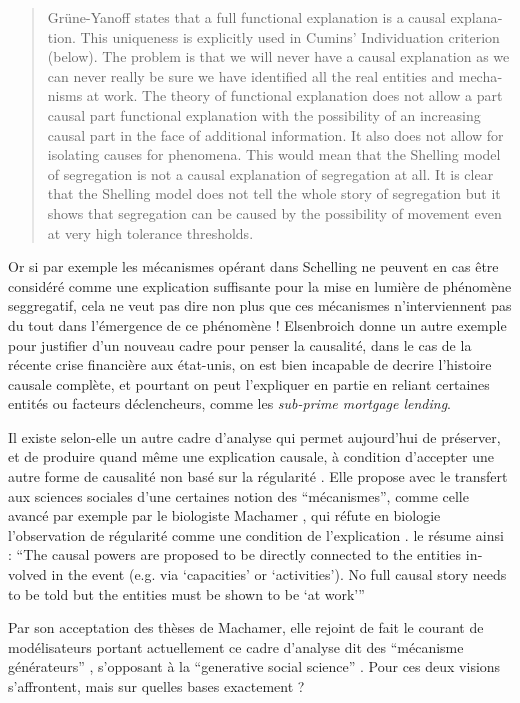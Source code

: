 \foreignblockquote{english}[\cite{Elsenbroich2012}]{Grüne-Yanoff states that a full functional explanation is a causal explanation. This uniqueness is explicitly used in Cumins' Individuation criterion (below). The problem is that we will never have a causal explanation as we can never really be sure we have identified all the real entities and mechanisms at work. The theory of functional explanation does not allow a part causal part functional explanation with the possibility of an increasing causal part in the face of additional information. It also does not allow for isolating causes for phenomena. This would mean that the Shelling model of segregation is not a causal explanation of segregation at all. It is clear that the Shelling model does not tell the whole story of segregation but it shows that segregation can be caused by the possibility of movement even at very high tolerance thresholds.}

Or si par exemple les mécanismes opérant dans Schelling ne peuvent en cas être considéré comme une explication suffisante pour la mise en lumière de phénomène seggregatif, cela ne veut pas dire non plus que ces mécanismes n'interviennent pas du tout dans l'émergence de ce phénomène ! Elsenbroich donne un autre exemple pour justifier d'un nouveau cadre pour penser la causalité, dans le cas de la récente crise financière aux état-unis, on est bien incapable de decrire l'histoire causale complète, et pourtant on peut l'expliquer en partie en reliant certaines entités ou facteurs déclencheurs, comme les \textit{sub-prime mortgage lending}.

Il existe selon-elle un autre cadre d'analyse qui permet aujourd'hui de préserver, et de produire quand même une explication causale, à condition d'accepter une autre forme de causalité non basé sur la régularité . Elle propose avec \textcite{Hedstrom2010} le transfert aux sciences sociales d'une certaines notion des \enquote{mécanismes}, comme celle avancé par exemple par le biologiste Machamer \textcite{Machamer2000}, qui réfute en biologie l'observation de régularité comme une condition de l'explication . \textcite{Elsenbroich2012} le résume ainsi : \foreignquote{english}{The causal powers are proposed to be directly connected to the entities involved in the event (e.g. via \enquote{capacities} or \enquote{activities}). No full causal story needs to be told but the entities must be shown to be \enquote{at work}} 

Par son acceptation des thèses de Machamer, elle rejoint de fait le courant de modélisateurs portant actuellement ce cadre d'analyse dit des \enquote{mécanisme générateurs} \autocites{Hedstrom2010, Manzo2007}, s'opposant à la \enquote{generative social science} \autocite{Epstein1999}. Pour \textcite[698]{Livet2014} ces deux visions s'affrontent, mais sur quelles bases exactement ? 

